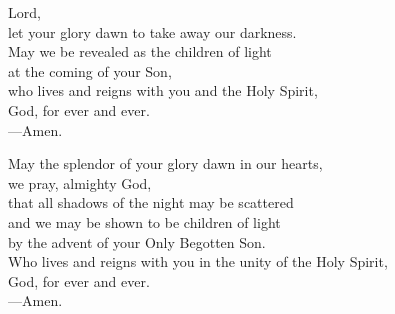 \prayer


\begin{prayerverse}
Lord,\\
let your glory dawn to take away our darkness.\\
May we be revealed as the children of light\\
at the coming of your Son,\\
who lives and reigns with you and the Holy Spirit,\\
God, for ever and ever.\\
{\color{red}---\thinspace}Amen.
\end{prayerverse}


\begin{prayerverse}
May the splendor of your glory dawn in our hearts,\\
we pray, almighty God,\\
that all shadows of the night may be scattered\\
and we may be shown to be children of light\\
by the advent of your Only Begotten Son.\\
Who lives and reigns with you in the unity of the Holy Spirit,\\
God, for ever and ever.\\
{\color{red}---\thinspace}Amen.
\end{prayerverse}

